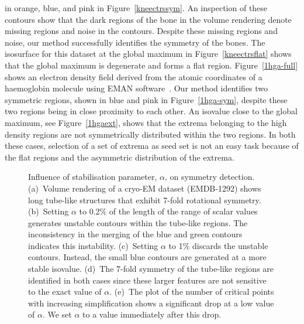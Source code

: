 \documentclass[review,journal]{vgtc}         %
\begin{document}
in orange, blue, and pink in Figure~\ref{kneectrssym}. An inspection of these contours show that the dark regions of the bone in 
the volume rendering denote missing regions and noise in the contours. Despite these missing regions and noise,
our method successfully identifies the symmetry of the bones. The isosurface for this dataset at
the global maximum in Figure~\ref{kneectrsflat} shows that the global maximum is degenerate
and forms a flat region. 
Figure~\ref{1hga-full} shows an electron density field
derived from the atomic coordinates of a haemoglobin molecule using EMAN software~\cite{ludtke1999eman}.
Our method identifies two symmetric regions, shown in blue and pink in Figure~\ref{1hga-sym},
despite these two regions being in close proximity to each other. An isovalue close to the
global maximum, see Figure~\ref{1hgaext}, shows that the extrema belonging to the high density regions are not
symmetrically distributed within the two regions. In both these cases, selection of a set of extrema as seed set 
is not an easy task because of the flat regions and the asymmetric distribution of the extrema.
\begin{figure*}[t]
	\centering
	\caption{\label{alpha}Influence of stabilisation parameter, $\alpha$, on symmetry detection. 
		(a)~Volume rendering of a cryo-EM dataset (EMDB-1292) shows long tube-like structures that
		exhibit 7-fold rotational symmetry. (b)~Setting $\alpha$ to 0.2\% of the length of the range of scalar
		values generates unstable contours within the tube-like regions. The inconsistency
		in the merging of the blue and green contours indicates this instability. (c)~Setting $\alpha$ to 1\% 
		discards the unstable contours. Instead, the small blue contours are generated at a more stable isovalue.
		(d)~The 7-fold symmetry of the tube-like regions are identified in both cases since 
		these larger features are not sensitive to the exact value of $\alpha$.	
		(e)~The plot of the number of critical points with increasing simplification shows a significant drop
		at a low value of $\alpha$. We set $\alpha$ to a value immediately after this drop.}
\end{figure*}
\end{document}
